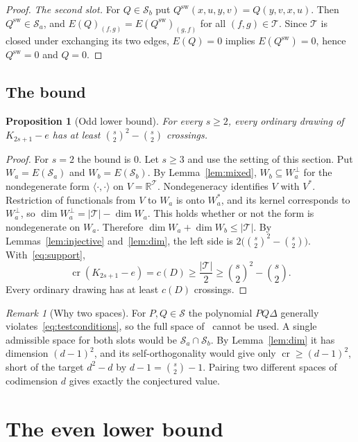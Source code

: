 \documentclass[11pt,a4paper]{article}
\newtheorem{proposition}[theorem]{Proposition}
\theoremstyle{definition}
\theoremstyle{remark}
\newtheorem{remark}[theorem]{Remark}
\numberwithin{equation}{section}
\newcommand{\R}{\mathbb R}
\newcommand{\crn}{\operatorname{cr}}
\newcommand{\SSS}{\mathcal S}
\newcommand{\TT}{\mathcal T}
\begin{document}
\begin{proof}
\emph{The second slot.} For $Q\in\SSS_b$ put $Q^{\mathrm{sw}}(x,u,y,v)=Q(y,v,x,u)$. Then $Q^{\mathrm{sw}}\in\SSS_a$, and $E(Q)_{(f,g)}=E(Q^{\mathrm{sw}})_{(g,f)}$ for all $(f,g)\in\TT$. Since $\TT$ is closed under exchanging its two edges, $E(Q)=0$ implies $E(Q^{\mathrm{sw}})=0$, hence $Q^{\mathrm{sw}}=0$ and $Q=0$.
\end{proof}

\subsection{The bound}

\begin{proposition}[Odd lower bound]\label{prop:odd}
For every $s\ge2$, every ordinary drawing of $K_{2s+1}-e$ has at least $\binom s2^2-\binom s2$ crossings.
\end{proposition}

\begin{proof}
For $s=2$ the bound is $0$. Let $s\ge3$ and use the setting of this section. Put $W_a=E(\SSS_a)$ and $W_b=E(\SSS_b)$. By Lemma~\ref{lem:mixed}, $W_b\subseteq W_a^\perp$ for the nondegenerate form $\langle\cdot,\cdot\rangle$ on $V=\R^\TT$. Nondegeneracy identifies $V$ with $V^*$. Restriction of functionals from $V$ to $W_a$ is onto $W_a^*$, and its kernel corresponds to $W_a^\perp$, so $\dim W_a^\perp=|\TT|-\dim W_a$. This holds whether or not the form is nondegenerate on $W_a$. Therefore $\dim W_a+\dim W_b\le|\TT|$. By Lemmas~\ref{lem:injective} and~\ref{lem:dim}, the left side is $2\bigl(\binom s2^2-\binom s2\bigr)$. With~\eqref{eq:support},
\[
\crn(K_{2s+1}-e)=c(D)\ge\frac{|\TT|}2\ge\binom s2^2-\binom s2 .
\]
Every ordinary drawing has at least $c(D)$ crossings.
\end{proof}

\begin{remark}[Why two spaces]\label{rem:split}
For $P,Q\in\SSS$ the polynomial $PQ\Delta$ generally violates~\eqref{eq:testconditions}, so the full space of~\cite{OAIKn} cannot be used. A single admissible space for both slots would be $\SSS_a\cap\SSS_b$. By Lemma~\ref{lem:dim} it has dimension $(d-1)^2$, and its self-orthogonality would give only $\crn\ge(d-1)^2$, short of the target $d^2-d$ by $d-1=\binom s2-1$. Pairing two different spaces of codimension $d$ gives exactly the conjectured value.
\end{remark}

\section{The even lower bound}\label{sec:even}
\end{document}
